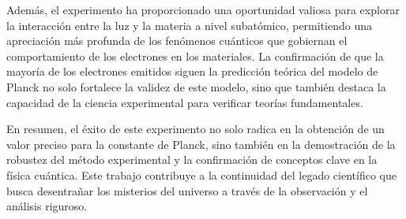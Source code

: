 \documentclass[twocolumn,a4paper,11pt]{scrartcl}
\begin{document}
Además, el experimento ha proporcionado una oportunidad valiosa para explorar la interacción entre la luz y la materia a nivel subatómico, permitiendo una apreciación más profunda de los fenómenos cuánticos que gobiernan el comportamiento de los electrones en los materiales. La confirmación de que la mayoría de los electrones emitidos siguen la predicción teórica del modelo de Planck no solo fortalece la validez de este modelo, sino que también destaca la capacidad de la ciencia experimental para verificar teorías fundamentales.

En resumen, el éxito de este experimento no solo radica en la obtención de un valor preciso para la constante de Planck, sino también en la demostración de la robustez del método experimental y la confirmación de conceptos clave en la física cuántica. Este trabajo contribuye a la continuidad del legado científico que busca desentrañar los misterios del universo a través de la observación y el análisis riguroso.



\end{document}
